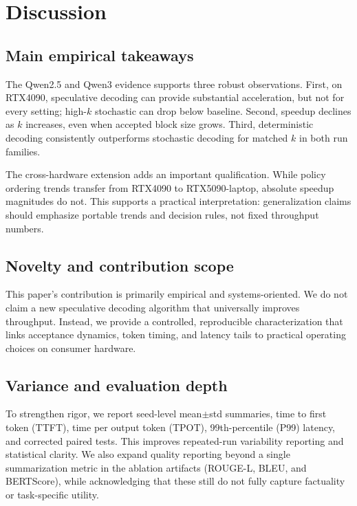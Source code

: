 \section{Discussion}
\label{sec:discussion}

\subsection{Main empirical takeaways}

The Qwen2.5 and Qwen3 evidence supports three robust observations.
First, on RTX4090, speculative decoding can provide substantial acceleration,
but not for every setting; high-$k$ stochastic can drop below baseline.
Second, speedup declines as $k$ increases, even when accepted block size grows.
Third, deterministic decoding consistently outperforms stochastic decoding
for matched $k$ in both run families.

The cross-hardware extension adds an important qualification.
While policy ordering trends transfer from RTX4090 to RTX5090-laptop,
absolute speedup magnitudes do not.
This supports a practical interpretation: generalization claims should emphasize
portable trends and decision rules, not fixed throughput numbers.

\subsection{Novelty and contribution scope}

This paper's contribution is primarily empirical and systems-oriented.
We do not claim a new speculative decoding algorithm that universally
improves throughput.
Instead, we provide a controlled, reproducible characterization that links
acceptance dynamics, token timing, and latency tails to practical operating
choices on consumer hardware.

\subsection{Variance and evaluation depth}

To strengthen rigor, we report seed-level mean$\pm$std summaries,
time to first token (TTFT), time per output token (TPOT), 99th-percentile
(P99) latency, and corrected paired tests.
This improves repeated-run variability reporting and statistical clarity.
We also expand quality reporting beyond a single summarization metric in the
ablation artifacts (ROUGE-L, BLEU, and BERTScore), while acknowledging that
these still do not fully capture factuality or task-specific utility.

